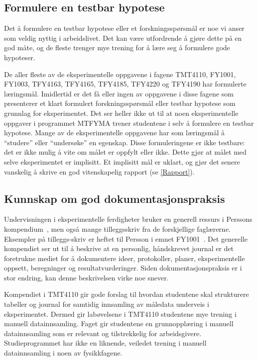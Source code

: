 \documentclass{article}
\begin{document}
\subsection{Formulere en testbar hypotese}
Det å formulere en testbar hypotese eller et forskningsspørsmål er noe vi anser som veldig nyttig i arbeidslivet. Det kan være utfordrende å gjøre dette på en god måte, og de fleste trenger mye trening for å lære seg å formulere gode hypoteser.

De aller fleste av de eksperimentelle oppgavene i fagene TMT4110, FY1001, FY1003, TFY4163, TFY4165, TFY4185, TFY4220 og TFY4190 har formulerte læringsmål. Imidlertid er det få eller ingen av oppgavene i disse fagene som presenterer et klart formulert forskningsspørsmål eller testbar hypotese som grunnlag for eksperimentet. Det ser heller ikke ut til at noen eksperimentelle oppgaver i programmet MTFYMA trener studentene i selv å formulere en testbar hypotese. Mange av de eksperimentelle oppgavene har som læringsmål å ``studere'' eller ``undersøke'' en egenskap. Disse formuleringene er ikke testbare: det er ikke mulig å vite om målet er oppfylt eller ikke. Dette gjør at målet med selve eksperimentet er implisitt. Et implisitt mål er uklart, og gjør det senere vanskelig å skrive en god vitenskapelig rapport (se \cref{Rapport}).

\subsection{Kunnskap om god dokumentasjonspraksis}
Undervisningen i eksperimentelle ferdigheter bruker en generell ressurs i Perssons kompendium~\cite{Persson2020}, men også mange tilleggsskriv fra de forskjellige faglærerne. Eksempler på tilleggs-skriv er heftet til Persson i emnet FY1001~\cite{Persson2020FY1001}. Det generelle kompendiet \cite{Persson2020} ser ut til å beskrive at en personlig, håndskrevet journal er det foretrukne mediet for å dokumentere ideer, protokoller, planer, eksperimentelle oppsett, beregninger og resultatvurderinger. Siden dokumentasjonspraksis er i stor endring, kan denne beskrivelsen virke noe snever.

Kompendiet i TMT4110 gir gode forslag til hvordan studentene skal strukturere tabeller og journal for samtidig innsamling av måledata underveis i eksperimentet. Dermed gir labøvelsene i TMT4110 studentene mye trening i manuell datainnsamling. Faget gir studentene en grunnopplæring i manuell datainnsamling som er relevant og tilstrekkelig for arbeidsgivere. Studieprogrammet har ikke en liknende, veiledet trening i manuell datainnsamling i noen av fysikkfagene.
\end{document}
